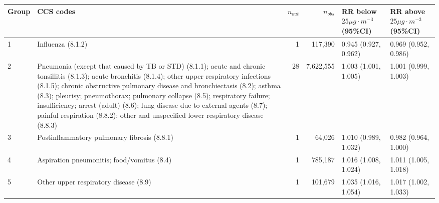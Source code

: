 \begin{tabular}{lp{6.5cm}rrp{2.2cm}p{2.2cm}}
  \hline
Group & CCS codes & $n_{out}$ & $n_{obs}$ & RR below $25 \mu g \cdot m^{-3}$ (95\%CI) & RR above $25 \mu g \cdot m^{-3}$ (95\%CI) \\ 
  \hline
   1 & Influenza (8.1.2) &    1 & 117,390 & 0.945 (0.927, 0.962) & 0.969 (0.952, 0.986) \\ 
     2 & Pneumonia (except that caused by TB or STD) (8.1.1); acute and chronic tonsillitis (8.1.3); acute bronchitis (8.1.4); other upper respiratory infections (8.1.5); chronic obstructive pulmonary disease and bronchiectasis (8.2); asthma (8.3); pleurisy; pneumothorax; pulmonary collapse (8.5); respiratory failure; insufficiency; arrest (adult) (8.6); lung disease due to external agents (8.7); painful respiration (8.8.2); other and unspecified lower respiratory disease (8.8.3) &   28 & 7,622,555 & 1.003 (1.001, 1.005) & 1.001 (0.999, 1.003) \\ 
     3 & Postinflammatory pulmonary fibrosis (8.8.1) &    1 & 64,026 & 1.010 (0.989, 1.032) & 0.982 (0.964, 1.000) \\ 
     4 & Aspiration pneumonitis; food/vomitus (8.4) &    1 & 785,187 & 1.016 (1.008, 1.024) & 1.011 (1.005, 1.018) \\ 
     5 & Other upper respiratory disease (8.9) &    1 & 101,679 & 1.035 (1.016, 1.054) & 1.017 (1.002, 1.033) \\ 
   \hline
\end{tabular}

